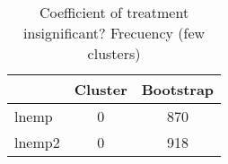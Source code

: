 \begin{table}[htbp]\centering
\caption{Coefficient of treatment insignificant? Frecuency (few clusters)}
\begin{tabular}{l*{2}{c}}
\toprule
            &     Cluster&   Bootstrap\\
\midrule
lnemp       &           0&         870\\
lnemp2      &           0&         918\\
\bottomrule
\end{tabular}
\end{table}
